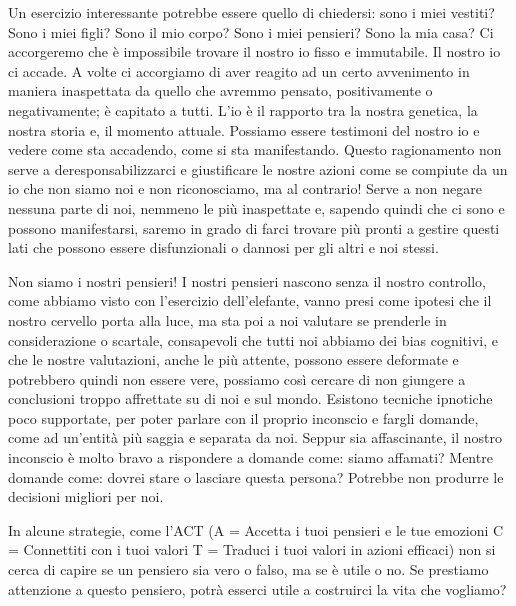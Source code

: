 \documentclass[12pt]{book} %
\begin{document}
Un esercizio interessante potrebbe essere quello di
chiedersi: sono i miei vestiti? Sono i miei figli? Sono il mio corpo? Sono i miei pensieri? Sono la mia casa? Ci
accorgeremo che è impossibile trovare il nostro io fisso e immutabile. Il nostro io ci accade. A volte ci accorgiamo di aver reagito ad un
certo avvenimento in maniera inaspettata da quello che avremmo pensato, positivamente o negativamente; è capitato a
tutti. L'io è il rapporto tra la nostra genetica, la nostra storia e, il momento attuale. Possiamo
essere testimoni del nostro io e vedere come sta accadendo, come si sta manifestando. Questo ragionamento non serve a
deresponsabilizzarci e giustificare le nostre azioni come se compiute da un io che non siamo noi e non riconosciamo, ma
al contrario! Serve a non negare nessuna parte di noi, nemmeno le più inaspettate e, sapendo quindi che ci sono e
possono manifestarsi, saremo in grado di farci trovare più pronti a gestire questi lati che possono essere
disfunzionali o dannosi per gli altri e noi stessi.

Non siamo i nostri pensieri! I nostri pensieri nascono senza il nostro controllo, come abbiamo visto con
l'esercizio dell'elefante, vanno presi come ipotesi che il nostro cervello
porta alla luce, ma sta poi a noi valutare se prenderle in considerazione o scartale, consapevoli che tutti noi
abbiamo dei bias cognitivi, e che le nostre valutazioni, anche le più attente, possono essere deformate e potrebbero quindi non
essere vere, possiamo così cercare di non giungere a conclusioni troppo affrettate su di noi e sul mondo. Esistono tecniche
ipnotiche poco supportate, per poter parlare con il proprio inconscio e fargli domande, come ad un'entità più saggia e separata da noi.
Seppur sia affascinante, il nostro inconscio è molto bravo a rispondere a domande come: siamo affamati? Mentre domande
come: dovrei stare o lasciare questa persona? Potrebbe non produrre le decisioni migliori per noi. 

In alcune strategie, come
l'ACT (A = Accetta i tuoi pensieri e le tue emozioni C = Connettiti con i tuoi valori T = Traduci
i tuoi valori in azioni efficaci) non si cerca di capire se un pensiero sia vero o falso, ma se è utile o no. Se
prestiamo attenzione a questo pensiero, potrà esserci utile a costruirci la vita che vogliamo?
\end{document}

